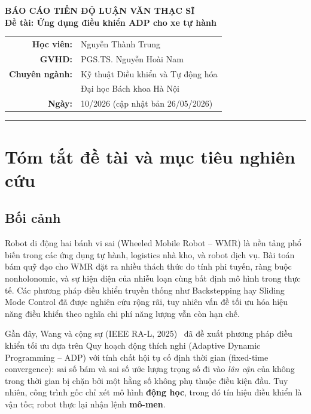 \documentclass[12pt,a4paper]{article}
\begin{document}
\begin{center}
    {\Large\bfseries BÁO CÁO TIẾN ĐỘ LUẬN VĂN THẠC SĨ} \\[10pt]
    {\large\bfseries Đề tài: Ứng dụng điều khiển ADP cho xe tự hành} \\[14pt]
    \begin{tabular}{rl}
        \textbf{Học viên:}      & Nguyễn Thành Trung \\
        \textbf{GVHD:}          & PGS.TS. Nguyễn Hoài Nam \\
        \textbf{Chuyên ngành:}  & Kỹ thuật Điều khiển và Tự động hóa \\
                                & Đại học Bách khoa Hà Nội \\
        \textbf{Ngày:}          & 10/2026 (cập nhật bản 26/05/2026) \\
    \end{tabular}
\end{center}

\vspace{6pt}\hrule\vspace{16pt}

\section{Tóm tắt đề tài và mục tiêu nghiên cứu}

\subsection{Bối cảnh}

Robot di động hai bánh vi sai (Wheeled Mobile Robot -- WMR) là nền tảng phổ biến trong các ứng dụng tự hành, logistics nhà kho, và robot dịch vụ. Bài toán bám quỹ đạo cho WMR đặt ra nhiều thách thức do tính phi tuyến, ràng buộc nonholonomic, và sự hiện diện của nhiễu loạn cùng bất định mô hình trong thực tế. Các phương pháp điều khiển truyền thống như Backstepping hay Sliding Mode Control đã được nghiên cứu rộng rãi, tuy nhiên vấn đề tối ưu hóa hiệu năng điều khiển theo nghĩa chi phí năng lượng vẫn còn hạn chế.

Gần đây, Wang và cộng sự (IEEE RA-L, 2025)~\cite{Wang2025} đã đề xuất phương pháp điều khiển tối ưu dựa trên Quy hoạch động thích nghi (Adaptive Dynamic Programming -- ADP) với tính chất hội tụ cố định thời gian (fixed-time convergence): sai số bám và sai số ước lượng trọng số đi vào \textit{lân cận} của không trong thời gian bị chặn bởi một hằng số không phụ thuộc điều kiện đầu. Tuy nhiên, công trình gốc chỉ xét mô hình \textbf{động học}, trong đó tín hiệu điều khiển là vận tốc; robot thực lại nhận lệnh \textbf{mô-men}.
\end{document}
